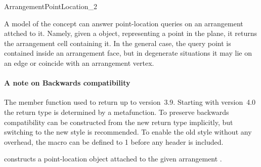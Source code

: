 
\ccRefPageBegin

\begin{ccRefConcept}{ArrangementPointLocation_2}

\ccDefinition

A model of the \ccRefName{} concept can answer point-location queries on
an arrangement attched to it. Namely, given a 
object, representing a point in the plane, it returns the arrangement cell
containing it. In the general case, the query point is contained inside an
arrangement face, but in degenerate situations it may lie on an edge or
coincide with an arrangement vertex.

\paragraph{A note on Backwards compatibility}
The  member function used to return  up to
\cgal{} version~3.9. Starting with \cal{} version~4.0 the return type
is determined by a metafunction. To preserve backwards compatibility
 can be constructed from the new return type
implicitly, but switching to the new style is recommended. To enable
the old style without any overhead, the macro
 can be defined to 1 before any
\cgal{} header is included.

\ccTypes



\ccCreation
{}


  {constructs a point-location object \ccVar{} attached to the given
   arrangement .}


\end{ccRefConcept}
